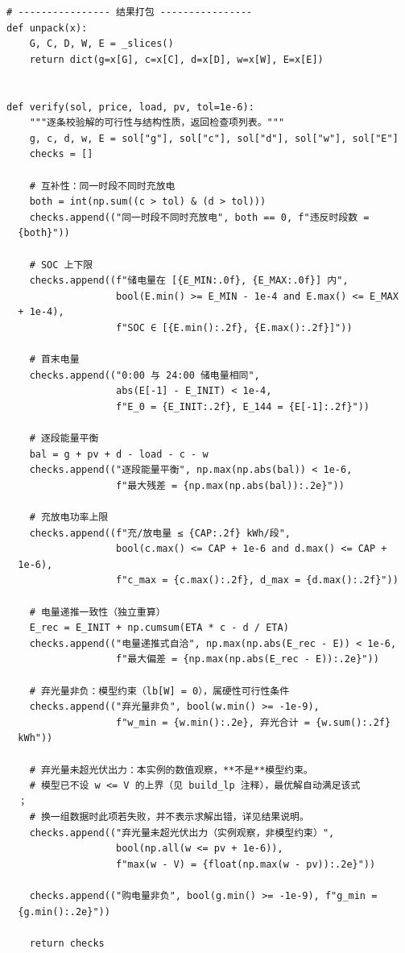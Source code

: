 \begin{verbatim}
# ---------------- 结果打包 ----------------
def unpack(x):
    G, C, D, W, E = _slices()
    return dict(g=x[G], c=x[C], d=x[D], w=x[W], E=x[E])


def verify(sol, price, load, pv, tol=1e-6):
    """逐条校验解的可行性与结构性质，返回检查项列表。"""
    g, c, d, w, E = sol["g"], sol["c"], sol["d"], sol["w"], sol["E"]
    checks = []

    # 互补性：同一时段不同时充放电
    both = int(np.sum((c > tol) & (d > tol)))
    checks.append(("同一时段不同时充放电", both == 0, f"违反时段数 =
  {both}"))

    # SOC 上下限
    checks.append((f"储电量在 [{E_MIN:.0f}, {E_MAX:.0f}] 内",
                   bool(E.min() >= E_MIN - 1e-4 and E.max() <= E_MAX
  + 1e-4),
                   f"SOC ∈ [{E.min():.2f}, {E.max():.2f}]"))

    # 首末电量
    checks.append(("0:00 与 24:00 储电量相同",
                   abs(E[-1] - E_INIT) < 1e-4,
                   f"E_0 = {E_INIT:.2f}, E_144 = {E[-1]:.2f}"))

    # 逐段能量平衡
    bal = g + pv + d - load - c - w
    checks.append(("逐段能量平衡", np.max(np.abs(bal)) < 1e-6,
                   f"最大残差 = {np.max(np.abs(bal)):.2e}"))

    # 充放电功率上限
    checks.append((f"充/放电量 ≤ {CAP:.2f} kWh/段",
                   bool(c.max() <= CAP + 1e-6 and d.max() <= CAP +
  1e-6),
                   f"c_max = {c.max():.2f}, d_max = {d.max():.2f}"))

    # 电量递推一致性（独立重算）
    E_rec = E_INIT + np.cumsum(ETA * c - d / ETA)
    checks.append(("电量递推式自洽", np.max(np.abs(E_rec - E)) < 1e-6,
                   f"最大偏差 = {np.max(np.abs(E_rec - E)):.2e}"))

    # 弃光量非负：模型约束（lb[W] = 0），属硬性可行性条件
    checks.append(("弃光量非负", bool(w.min() >= -1e-9),
                   f"w_min = {w.min():.2e}, 弃光合计 = {w.sum():.2f}
  kWh"))

    # 弃光量未超光伏出力：本实例的数值观察，**不是**模型约束。
    # 模型已不设 w <= V 的上界（见 build_lp 注释），最优解自动满足该式
  ；
    # 换一组数据时此项若失败，并不表示求解出错，详见结果说明。
    checks.append(("弃光量未超光伏出力（实例观察，非模型约束）",
                   bool(np.all(w <= pv + 1e-6)),
                   f"max(w - V) = {float(np.max(w - pv)):.2e}"))

    checks.append(("购电量非负", bool(g.min() >= -1e-9), f"g_min =
  {g.min():.2e}"))

    return checks
\end{verbatim}

